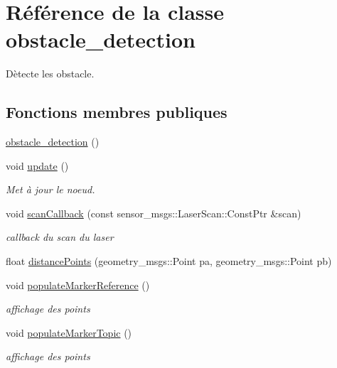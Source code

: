 \hypertarget{classobstacle__detection}{}\section{Référence de la classe obstacle\+\_\+detection}
\label{classobstacle__detection}


Dètecte les obstacle.  


\subsection*{Fonctions membres publiques}
\begin{DoxyCompactItemize}
\item 
\hyperlink{classobstacle__detection_ab08b8acb922c41ba5f02162c96b6c2a3}{obstacle\+\_\+detection} ()
\item 
void \hyperlink{classobstacle__detection_a73c0891b4804320f065eca202ad37d3c}{update} ()
\begin{DoxyCompactList}\small\item\em Met à jour le noeud. \end{DoxyCompactList}\item 
void \hyperlink{classobstacle__detection_ac02d5622432bbc80baf85f5aed2fb96c}{scan\+Callback} (const sensor\+\_\+msgs\+::\+Laser\+Scan\+::\+Const\+Ptr \&scan)
\begin{DoxyCompactList}\small\item\em callback du scan du laser \end{DoxyCompactList}\item 
float \hyperlink{classobstacle__detection_ae49732fddd097ef980f5ced0cb92c36a}{distance\+Points} (geometry\+\_\+msgs\+::\+Point pa, geometry\+\_\+msgs\+::\+Point pb)
\item 
void \hyperlink{classobstacle__detection_a774f35d9c786a833adeedbd6e99238ce}{populate\+Marker\+Reference} ()
\begin{DoxyCompactList}\small\item\em affichage des points \end{DoxyCompactList}\item 
void \hyperlink{classobstacle__detection_a362d6d5ccf311fb071fd60054509ec0c}{populate\+Marker\+Topic} ()
\begin{DoxyCompactList}\small\item\em affichage des points \end{DoxyCompactList}\end{DoxyCompactItemize}
